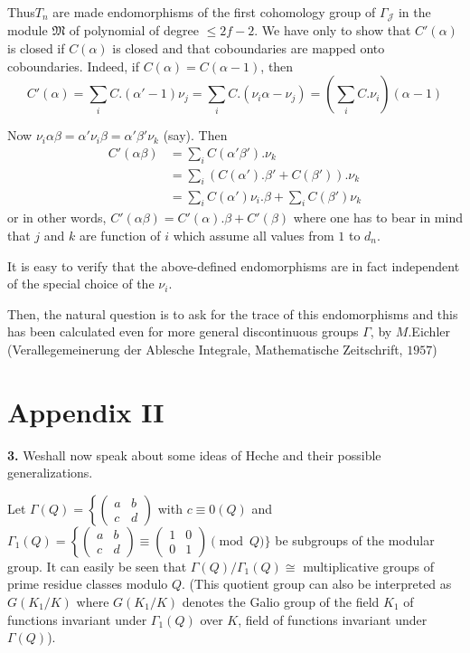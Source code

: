Thus\pageoriginale $T_n$ are made endomorphisms of the first cohomology group of
$\Gamma_{\mathcal{J}}$ in the module $\mathfrak{M}$ of polynomial of degree $\leq
2f-2$. We have only to show that $C'(\alpha)$ is closed if $C(\alpha)$
is closed and that coboundaries are mapped onto coboundaries. Indeed,
if $C(\alpha)=C(\alpha-1)$, then  
$$
C'(\alpha)=\sum_i C. (\alpha'-1)\nu_j =\sum_i C. (\nu_i \alpha
-\nu_j)= \left(\sum_i C.\nu_i\right)(\alpha-1) 
$$

Now $\nu_i \alpha \beta=\alpha' \nu_i \beta=\alpha' \beta' \nu_k$ (say). Then
\begin{align*}
  C'(\alpha \beta)&= \sum_i C(\alpha' \beta'). \nu_k \\
  &=\sum_i (C(\alpha'). \beta' + C(\beta')).\nu_k\\
  &= \sum_i C(\alpha')\nu_i. \beta +\sum_i C(\beta')\nu_k
\end{align*}
or in other words, $C'(\alpha \beta)=C'(\alpha).\beta+C'(\beta)$ where
one has to bear in mind that $j$ and $k$ are function of $i$ which
assume all values from $1$ to $d_n$. 

It is easy to verify that the above-defined endomorphisms are in fact
independent of the special choice of the $\nu_i$. 

Then, the natural question is to ask for the trace of this
endomorphisms and this has been calculated even for more general
discontinuous groups $\Gamma$, by $M$.Eichler (Verallegemeinerung der
Ablesche Integrale, Mathematische Zeitschrift, $1957$) 

\chapter{Appendix II}

\textbf{3.} We\pageoriginale shall now speak about some ideas of Heche
and their possible generalizations. 

Let $\Gamma (Q)=\left\{ \begin{pmatrix}a&b\\c&d \end{pmatrix}\right.$ with $c
\equiv 0(Q)$ and $\Gamma
_1(Q)=\left\{ \begin{pmatrix}a&b\\c&d \end{pmatrix}\right. \equiv
\begin{pmatrix}1&0\\0&1 \end{pmatrix}\pmod Q \bigg \}$
be subgroups of the modular group. It can easily be seen that $\Gamma
(Q)/\Gamma_1(Q)\cong$ multiplicative groups of prime residue
classes modulo $Q$. (This quotient group can also be interpreted as
$G(K_1/K)$ where $G(K_1/K)$ denotes the Galio group of the field $K_1$
of functions invariant under $\Gamma_1(Q)$ over $K$, field of
functions invariant under $\Gamma (Q)$). 

